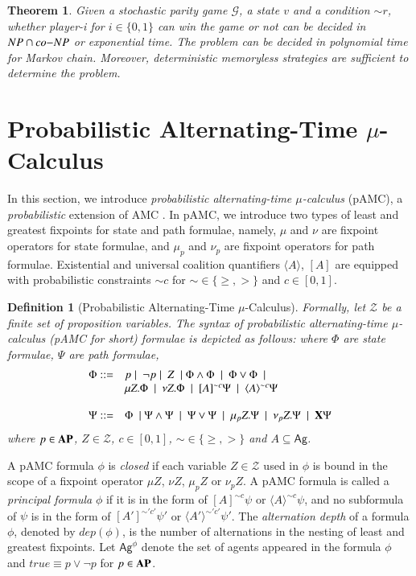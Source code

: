 \documentclass[letterpaper]{article}
\newcommand{\AP}{{\bf AP}}
\newcommand{\calZ}{\mathcal{Z}}
\newcommand{\calM}{\mathcal{G}}
\newcommand{\Ag}{\textsf{Ag}}
\newcommand{\pamc}{{pAMC}\xspace}
\newcommand{\opX}{{\bf X}}
\newcommand{\opA}[1]{\langle{#1}\rangle}
\newcommand{\opUA}[1]{[{#1}]}
\newtheorem{definition}{Definition}
\newtheorem{theorem}{Theorem}
\begin{document}
\begin{theorem}
\label{thm-spg}\cite{CJH04,CH12}
Given a stochastic parity game $\calM$, a state $v$ and a condition $\sim r$, whether player-i for $i\in\{0,1\}$ can win the game or not can be decided in ${\sc NP\cap co{-}NP}$ or exponential time. The problem can be decided in polynomial time for Markov chain.
Moreover, deterministic memoryless strategies are sufficient to determine the problem.
\end{theorem}


\section{Probabilistic Alternating-Time $\mu$-Calculus}
In this section, we introduce \emph{probabilistic alternating-time $\mu$-calculus} (\pamc), a \emph{probabilistic} extension of AMC \cite{AHK02}.
In \pamc, we introduce two types of least and greatest fixpoints for state and path formulae, namely,
$\mu$ and $\nu$ are fixpoint operators for state formulae, and $\mu_p$ and $\nu_p$ are fixpoint operators for path formulae.
Existential and universal coalition quantifiers $\opA{A}$, $\opUA{A}$ are equipped with probabilistic constraints $\sim c$ for $\sim\in\{\geq, >\}$
and $c\in[0,1]$.


\begin{definition}[Probabilistic Alternating-Time $\mu$-Calculus]
Formally, let $\calZ$ be a finite set of proposition variables. The syntax of probabilistic alternating-time $\mu$-calculus (\pamc for short) formulae is depicted as follows: where
$\Phi$ are \emph{state formulae}, $\Psi$ are \emph{path formulae},
 \[\begin{array}{ll}
\Phi::= &p\mid  \ \neg p \mid  \ Z \ \mid \Phi \wedge \Phi  \ \mid  \ \Phi \vee \Phi \ \mid \\
& \mu Z. \Phi  \ \mid \ \nu Z. \Phi  \  \mid \ \opUA{A}^{\sim c} \Psi  \ \mid \   \opA{A}^{\sim c} \Psi\\\\
\Psi::=&\Phi \ \mid \Psi \wedge \Psi  \ \mid  \ \Psi \vee \Psi \ \mid \  \mu_p Z. \Psi  \ \mid \  \nu_p Z. \Psi \ \mid \ \opX \Psi
 \end{array}\]
where $p\in\AP$, $Z\in \calZ$, $c\in[0,1]$, $\sim\in\{\geq,>\}$ and  $A\subseteq \Ag$.
\end{definition}

A \pamc formula $\phi$ is \emph{closed} if each variable $Z\in \calZ$ used in $\phi$ is bound in the scope of a fixpoint operator $\mu Z$, $\nu Z$, $\mu_p Z$ or $\nu_p Z$.
A \pamc formula is called  a \emph{principal formula} $\phi$ if it is in the form of $\opUA{A}^{\sim c} \psi$ or $\opA{A}^{\sim c} \psi$, and no subformula of $\psi$
is in the form of $\opUA{A'}^{\sim' c'} \psi'$ or $\opA{A'}^{\sim' c'} \psi'$.
The \emph{alternation depth} of a formula $\phi$, denoted by $dep(\phi)$, is the number of alternations in the nesting of least and greatest fixpoints.
Let $\Ag^\phi$ denote the set of agents appeared in the formula $\phi$ and $true \equiv p\vee \neg p$ for $p\in\AP$.
\end{document}
